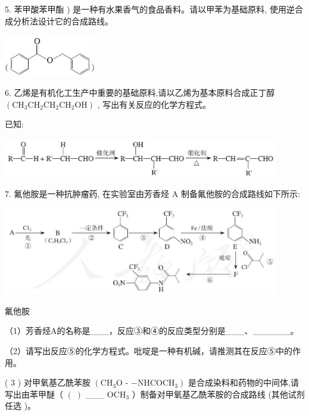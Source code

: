 \documentclass[10pt]{article}
\begin{document}
5. 苯甲酸苯甲酯 ) 是一种有水果香气的食品香料。请以甲苯为基础原料, 使用逆合成分析法设计它的合成路线。

\begin{center}
\includegraphics[max width=0.3\textwidth]{images/0190efc5-b58a-7c43-bfb0-e0a030df9cfd_97_768428.jpg}
\end{center}

6. 乙烯是有机化工生产中重要的基础原料,请以乙烯为基本原料合成正丁醇 \(\left( {{\mathrm{{CH}}}_{3}{\mathrm{{CH}}}_{2}{\mathrm{{CH}}}_{2}{\mathrm{{CH}}}_{2}\mathrm{{OH}}}\right)\) , 写出有关反应的化学方程式。

已知:

\begin{center}
\includegraphics[max width=0.9\textwidth]{images/0190efc5-b58a-7c43-bfb0-e0a030df9cfd_97_258997.jpg}
\end{center}

7. 氟他胺是一种抗肿瘤药, 在实验室由芳香烃 A 制备氟他胺的合成路线如下所示:

\begin{center}
\includegraphics[max width=0.9\textwidth]{images/0190efc5-b58a-7c43-bfb0-e0a030df9cfd_97_995719.jpg}
\end{center}

氟他胺

（1）芳香烃A的名称是\_\_\_，反应③和④的反应类型分别是\_\_\_、\_\_\_\_\_\_。

（2）请写出反应⑤的化学方程式。吡啶是一种有机碱，请推测其在反应⑤中的作用。

( 3 ) 对甲氧基乙酰苯胺 \(\left( {{\mathrm{{CH}}}_{3}\mathrm{O}}\right.\) - \(\left. {-{\mathrm{{NHCOCH}}}_{3}}\right)\) 是合成染料和药物的中间体,请写出由苯甲醚（ \(\left( \;\right)\) \_\_\_ \({\mathrm{{OCH}}}_{3}\) ）制备对甲氧基乙酰苯胺的合成路线 (其他试剂任选 )。
\end{document}
